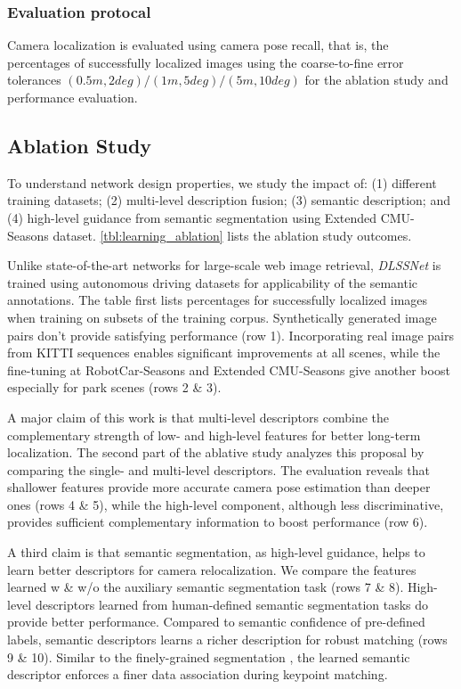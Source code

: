 \subsubsection{Evaluation protocal}
Camera localization is evaluated using camera pose recall, that is, the percentages of successfully localized images using the coarse-to-fine error tolerances $(0.5m, 2deg) / (1m, 5deg) / (5m, 10deg)$ for the ablation study and performance evaluation.

\subsection{Ablation Study}
To understand network design properties, we study the impact of:
(1) different training datasets; 
(2) multi-level description fusion; 
(3) semantic description; and 
(4) high-level guidance from semantic segmentation using Extended CMU-Seasons dataset.
\ref{tbl:learning_ablation} lists the ablation study outcomes.

Unlike state-of-the-art networks for large-scale web image retrieval, {\em DLSSNet} is trained using autonomous driving datasets for applicability of
the semantic annotations.  
The table first lists percentages for successfully localized images when training on subsets of the training corpus.
Synthetically generated image pairs don't provide satisfying performance (row 1). 
Incorporating real image pairs from KITTI sequences enables significant improvements at all scenes, while the fine-tuning at RobotCar-Seasons
and Extended CMU-Seasons give another boost especially for park scenes
(rows 2 \& 3).

A major claim of this work is that multi-level descriptors combine the complementary strength of low- and high-level features for better long-term localization. 
The second part of the ablative study analyzes this proposal by comparing the single- and multi-level descriptors.  
The evaluation reveals that shallower features provide more accurate camera pose estimation than deeper ones (rows 4 \& 5), while the high-level component, although less discriminative, provides sufficient complementary information to boost performance (row 6).
  
A third claim is that semantic segmentation, as high-level guidance, helps to learn better descriptors for camera relocalization. 
We compare the features learned w \& w/o the auxiliary semantic segmentation task (rows 7 \& 8). 
High-level descriptors learned from human-defined semantic segmentation tasks do provide better performance.
Compared to semantic confidence of pre-defined labels, semantic descriptors learns a richer description for robust matching (rows 9 \& 10). 
Similar to the finely-grained segmentation \cite{larsson2019fine}, the learned semantic descriptor enforces a finer data association during keypoint matching.
 
